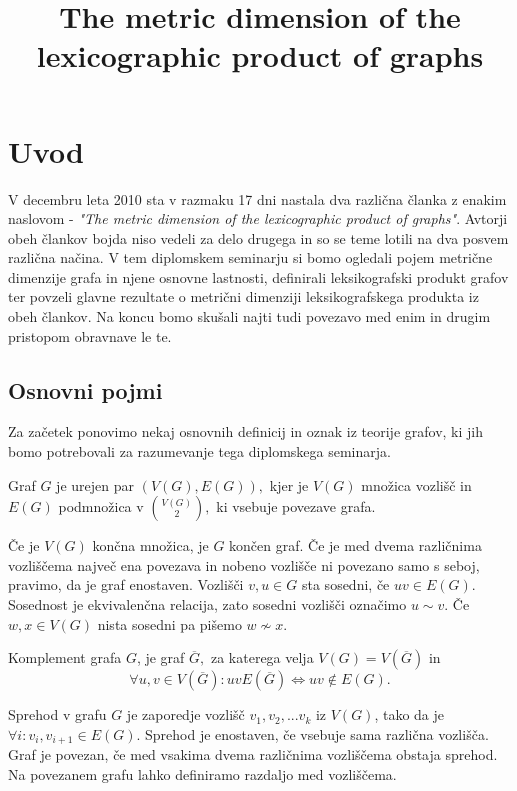 \documentclass[mat1, tisk]{fmfdelo}
\title{The metric dimension of the lexicographic product of graphs}
\begin{document}
\section{Uvod}
V decembru leta 2010 sta v razmaku 17 dni nastala dva različna članka z enakim naslovom - 
\textit{"The metric dimension of the lexicographic product of graphs"}. Avtorji obeh člankov 
bojda niso vedeli za delo drugega in so se teme lotili na dva posvem različna načina. 
V tem diplomskem seminarju si bomo ogledali pojem metrične dimenzije grafa in njene osnovne 
lastnosti, definirali leksikografski produkt grafov ter povzeli glavne rezultate o metrični 
dimenziji leksikografskega produkta iz obeh člankov. Na koncu bomo skušali najti tudi 
povezavo med enim in drugim pristopom obravnave le te. 




\subsection{Osnovni pojmi}
Za začetek ponovimo nekaj osnovnih definicij in oznak iz teorije grafov, ki jih bomo potrebovali 
za razumevanje tega diplomskega seminarja. 

\begin{definicija}
    Graf $G$ je urejen par $(V(G), E(G)),$ kjer je $V(G)$ množica vozlišč in $E(G)$ 
    podmnožica v $\binom{V(G)}{2},$ ki vsebuje povezave grafa.
\end{definicija}

Če je $V(G)$ končna množica, je $G$ končen graf. Če je med dvema različnima vozliščema največ 
ena povezava in nobeno vozlišče ni povezano samo s seboj, pravimo, da je graf enostaven. 
Vozlišči $v, u \in G$ sta sosedni, če $uv \in E(G).$ Sosednost je ekvivalenčna relacija, zato 
sosedni vozlišči označimo $u \sim v.$ Če $w, x \in V(G)$ nista sosedni pa pišemo $w \not \sim x.$

\begin{definicija}
    Komplement grafa $G$, je graf $\overline{G},$ za katerega velja $V(G) = V(\overline{G})$ in 
    $$\forall u,v \in V(\overline{G}): uv E(\overline{G}) \Leftrightarrow uv \not \in E(G).$$
\end{definicija}

Sprehod v grafu $G$ je zaporedje vozlišč $v_1, v_2, ... v_k$ iz $V(G)$, tako da je 
$\forall i : v_i, v_{i+1} \in E(G).$ Sprehod je enostaven, če vsebuje sama različna vozlišča.
Graf je povezan, če med vsakima dvema različnima vozliščema obstaja sprehod. Na povezanem
grafu lahko definiramo razdaljo med vozliščema.
\end{document}
